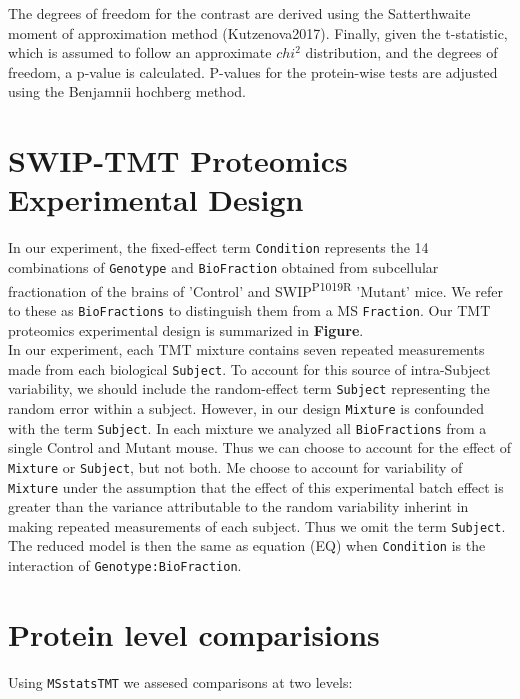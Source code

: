 \documentclass[11pt]{elife}\usepackage[]{graphicx}\usepackage[]{color}
\begin{document}
The degrees of freedom for the contrast are derived using the Satterthwaite
moment of approximation method (Kutzenova2017).
Finally, given the t-statistic, which is assumed to follow an approximate
$chi^2$ distribution, and the degrees of freedom, a p-value is calculated. 
P-values for the protein-wise tests are adjusted using the
Benjamnii hochberg method.\\


\section{SWIP-TMT Proteomics Experimental Design}

In our experiment, the fixed-effect term \texttt{Condition} represents the 14
combinations of \texttt{Genotype} and \texttt{BioFraction} obtained from 
subcellular fractionation of the brains of 'Control' and 
SWIP\textsuperscript{P1019R} 'Mutant' mice. We refer to these as
\texttt{BioFractions} to distinguish them from a MS \texttt{Fraction}. 
Our TMT proteomics experimental design is summarized in \textbf{Figure}.\\

In our experiment, each TMT mixture contains seven repeated measurements
made from each biological \texttt{Subject}. To account for this source of
intra-Subject variability, we should include the random-effect term
\texttt{Subject} representing the random error within a subject. However, in our
design \texttt{Mixture} is confounded with the term \texttt{Subject}. In
each mixture we analyzed all \texttt{BioFractions} from a single Control and
Mutant mouse.  Thus we can choose to account for the effect of \texttt{Mixture}
or \texttt{Subject}, but not both. Me choose to account for variability of 
\texttt{Mixture} under the assumption that the effect of this experimental batch 
effect is greater than the variance attributable to the random variability
inherint in making repeated measurements of each subject. 
Thus we omit the term \texttt{Subject}. The reduced model is then the same as
equation (EQ) when \texttt{Condition} is the interaction of 
\texttt{Genotype:BioFraction}.\\


\section{Protein level comparisions}

Using \texttt{MSstatsTMT} we assesed comparisons at two levels:
\end{document}
